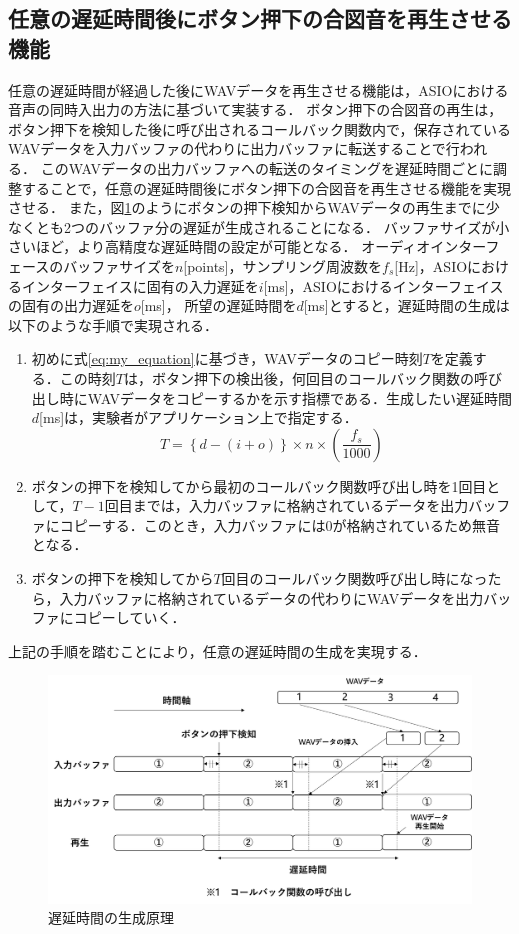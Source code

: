 \subsection{任意の遅延時間後にボタン押下の合図音を再生させる機能}
任意の遅延時間が経過した後にWAVデータを再生させる機能は，ASIOにおける音声の同時入出力の方法に基づいて実装する．
ボタン押下の合図音の再生は，ボタン押下を検知した後に呼び出されるコールバック関数内で，保存されているWAVデータを入力バッファの代わりに出力バッファに転送することで行われる．
このWAVデータの出力バッファへの転送のタイミングを遅延時間ごとに調整することで，任意の遅延時間後にボタン押下の合図音を再生させる機能を実現させる．
また，図\ref{fig:delay_theory}のようにボタンの押下検知からWAVデータの再生までに少なくとも2つのバッファ分の遅延が生成されることになる．
バッファサイズが小さいほど，より高精度な遅延時間の設定が可能となる．
オーディオインターフェースのバッファサイズを$n$[points]，サンプリング周波数を$f_{s}$[Hz]，ASIOにおけるインターフェイスに固有の入力遅延を$i$[ms]，ASIOにおけるインターフェイスの固有の出力遅延を$o$[ms]，
所望の遅延時間を$d$[ms]とすると，遅延時間の生成は以下のような手順で実現される．
\begin{enumerate}[leftmargin=*]
  \item 初めに式\ref{eq:my_equation}に基づき，WAVデータのコピー時刻$T$を定義する．この時刻$T$は，ボタン押下の検出後，何回目のコールバック関数の呼び出し時にWAVデータをコピーするかを示す指標である．生成したい遅延時間$d$[ms]は，実験者がアプリケーション上で指定する．
\begin{equation}
T = \left\{ d - (i + o) \right\} \times n \times \left( \frac{f_s}{1000} \right) \label{eq:my_equation}
\end{equation}

  \item ボタンの押下を検知してから最初のコールバック関数呼び出し時を1回目として，$T-1$回目までは，入力バッファに格納されているデータを出力バッファにコピーする．このとき，入力バッファには0が格納されているため無音となる．
  \item ボタンの押下を検知してから$T$回目のコールバック関数呼び出し時になったら，入力バッファに格納されているデータの代わりにWAVデータを出力バッファにコピーしていく．
\end{enumerate}
上記の手順を踏むことにより，任意の遅延時間の生成を実現する．
\begin{figure}[h]
  \centering
  \includegraphics[scale=0.12]{figures/System/Delay_theory.pdf}
  \caption{遅延時間の生成原理}
  \label{fig:delay_theory}
\end{figure}
